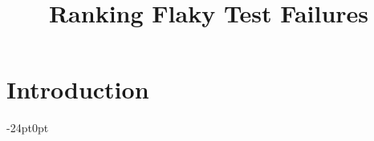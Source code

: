 \documentclass[10pt,conference,letterpaper]{IEEEtran}
\begin{document}
\title{Ranking Flaky Test Failures}
\author{}
\maketitle
\enlargethispage{2\baselineskip}
\section{Introduction}
\lipsum[1]
\begin{adjustwidth}{-24pt}{0pt}
\lipsum[2]
\end{adjustwidth}
\lipsum[3-14]
\end{document}
